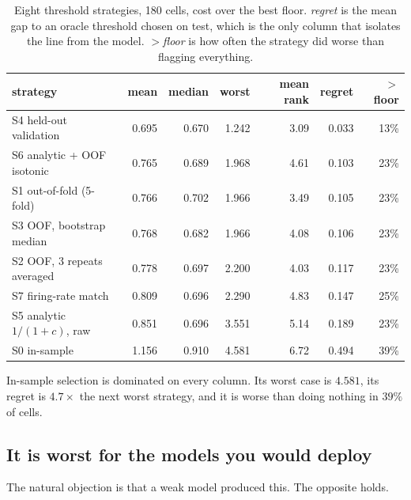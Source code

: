 \documentclass[11pt]{article}
\begin{document}
\begin{table}[t]
\centering\small
\begin{tabular}{lrrrrrr}
\toprule
strategy & mean & median & worst & mean rank & regret & $>$floor \\
\midrule
S4 held-out validation      & 0.695 & 0.670 & 1.242 & 3.09 & 0.033 & 13\% \\
S6 analytic + OOF isotonic  & 0.765 & 0.689 & 1.968 & 4.61 & 0.103 & 23\% \\
S1 out-of-fold (5-fold)     & 0.766 & 0.702 & 1.966 & 3.49 & 0.105 & 23\% \\
S3 OOF, bootstrap median    & 0.768 & 0.682 & 1.966 & 4.08 & 0.106 & 23\% \\
S2 OOF, 3 repeats averaged  & 0.778 & 0.697 & 2.200 & 4.03 & 0.117 & 23\% \\
S7 firing-rate match        & 0.809 & 0.696 & 2.290 & 4.83 & 0.147 & 25\% \\
S5 analytic $1/(1+c)$, raw  & 0.851 & 0.696 & 3.551 & 5.14 & 0.189 & 23\% \\
S0 in-sample                & 1.156 & 0.910 & 4.581 & 6.72 & 0.494 & 39\% \\
\bottomrule
\end{tabular}
\caption{Eight threshold strategies, 180 cells, cost over the best floor. \emph{regret} is the
mean gap to an oracle threshold chosen on test, which is the only column that isolates the line
from the model. \emph{$>$floor} is how often the strategy did worse than flagging everything.}
\label{tab:strategies}
\end{table}

In-sample selection is dominated on every column. Its worst case is $4.581$, its regret is
$4.7\times$ the next worst strategy, and it is worse than doing nothing in $39\%$ of cells.

\subsection{It is worst for the models you would deploy}

The natural objection is that a weak model produced this. The opposite holds.
\end{document}
